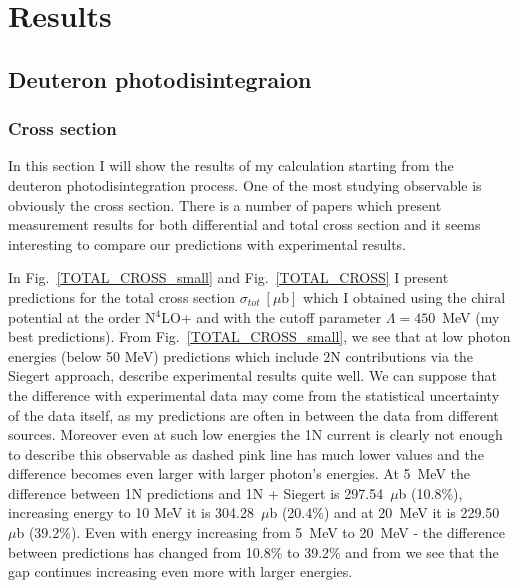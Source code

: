 \chapter{Results}

\section{Deuteron photodisintegraion}

    \subsection{Cross section}
    \label{cross_results}

    In this section I will show the results of my calculation starting from the
    deuteron photodisintegration process. One of the most
    studying observable is obviously the cross section. There is
    a number of papers which present 
    measurement results for both differential and total cross section
    \cite{BOSMAN1979,ARENDS1984,Skopik1974, Moreh1989, Birenbaum1985, Bernabei1986, rachek2007,Ying_Experiment_Deut, DeSanctis_Experiment_Deut} 
    and it seems interesting to compare 
    our predictions with experimental results.

    In Fig.~\ref{TOTAL_CROSS_small} and Fig.~\ref{TOTAL_CROSS} 
    I present predictions for the
    total cross section $\sigma_{tot}~[\mu\text{b}]$ which I obtained
    using the chiral potential at the order N$^4$LO+ and with 
    the cutoff parameter $\Lambda=450$~MeV (my best predictions).
    From Fig.~\ref{TOTAL_CROSS_small}, we see that at low photon energies
    (below 50 MeV) predictions which include 2N contributions
    via the Siegert approach, describe experimental results quite well.
    We can suppose that the difference with experimental data may come from 
    the statistical uncertainty of  the data itself, as my predictions
    are often in between the data from different sources.
    Moreover even at such low energies the 1N current is clearly not enough
    to describe this observable as dashed pink line has much lower values and
    the difference becomes even larger with larger photon's energies.
    At 5~MeV the difference between 1N predictions
    and 1N + Siegert is 297.54~$\mu$b (10.8\%), increasing energy to 10 MeV
    it is 304.28~$\mu$b (20.4\%) and at 20~MeV it is 229.50~$\mu$b (39.2\%).
    Even with energy increasing from 5~MeV to 20~MeV -
    the difference between predictions has changed from 10.8\% to 39.2\% and
    from  we see that the gap  continues increasing even more with larger energies.

